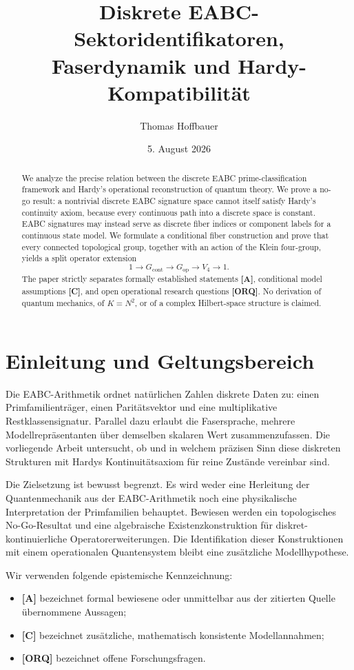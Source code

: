 \documentclass[11pt,a4paper,reqno]{amsart}
\title[EABC-Sektoren und Hardy-Kompatibilität]{Diskrete EABC-Sektoridentifikatoren, Faserdynamik und Hardy-Kompatibilität}
\author{Thomas Hoffbauer}
\date{5. August 2026}
\theoremstyle{definition}
\theoremstyle{remark}
\newcommand{\StatusA}{\textnormal{\textbf{[A]}}}
\newcommand{\StatusC}{\textnormal{\textbf{[C]}}}
\newcommand{\StatusORQ}{\textnormal{\textbf{[ORQ]}}}
\begin{document}
\begin{abstract}
We analyze the precise relation between the discrete EABC prime-classification framework and Hardy's operational reconstruction of quantum theory. We prove a no-go result: a nontrivial discrete EABC signature space cannot itself satisfy Hardy's continuity axiom, because every continuous path into a discrete space is constant. EABC signatures may instead serve as discrete fiber indices or component labels for a continuous state model. We formulate a conditional fiber construction and prove that every connected topological group, together with an action of the Klein four-group, yields a split operator extension
\[
1\longrightarrow G_{\mathrm{cont}}\longrightarrow G_{\mathrm{op}}\longrightarrow V_4\longrightarrow 1.
\]
The paper strictly separates formally established statements \textbf{[A]}, conditional model assumptions \textbf{[C]}, and open operational research questions \textbf{[ORQ]}. No derivation of quantum mechanics, of $K=N^2$, or of a complex Hilbert-space structure is claimed.
\end{abstract}

\maketitle

\section{Einleitung und Geltungsbereich}

Die EABC-Arithmetik ordnet natürlichen Zahlen diskrete Daten zu: einen Primfamilienträger, einen Paritätsvektor und eine multiplikative Restklassensignatur. Parallel dazu erlaubt die Fasersprache, mehrere Modellrepräsentanten über demselben skalaren Wert zusammenzufassen. Die vorliegende Arbeit untersucht, ob und in welchem präzisen Sinn diese diskreten Strukturen mit Hardys Kontinuitätsaxiom für reine Zustände vereinbar sind.

Die Zielsetzung ist bewusst begrenzt. Es wird weder eine Herleitung der Quantenmechanik aus der EABC-Arithmetik noch eine physikalische Interpretation der Primfamilien behauptet. Bewiesen werden ein topologisches No-Go-Resultat und eine algebraische Existenzkonstruktion für diskret-kontinuierliche Operatorerweiterungen. Die Identifikation dieser Konstruktionen mit einem operationalen Quantensystem bleibt eine zusätzliche Modellhypothese.

Wir verwenden folgende epistemische Kennzeichnung:
\begin{itemize}[leftmargin=2.2em]
  \item \StatusA{} bezeichnet formal bewiesene oder unmittelbar aus der zitierten Quelle übernommene Aussagen;
  \item \StatusC{} bezeichnet zusätzliche, mathematisch konsistente Modellannahmen;
  \item \StatusORQ{} bezeichnet offene Forschungsfragen.
\end{itemize}
\end{document}
